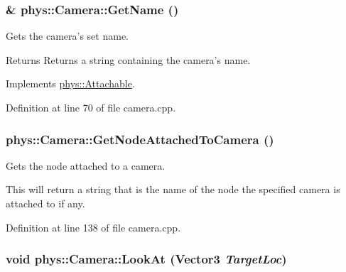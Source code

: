 \hypertarget{classphys_1_1Camera_aee08e3932237c76d2b59652878f2bdf6}{
\subsubsection[{GetName}]{ \& phys::Camera::GetName ()}}
\label{d9/df8/classphys_1_1Camera_aee08e3932237c76d2b59652878f2bdf6}


Gets the camera's set name. 

\begin{DoxyReturn}{Returns}
Returns a string containing the camera's name. 
\end{DoxyReturn}


Implements \hyperlink{classphys_1_1Attachable_ad1a9bbd300fe21c5cc7e5aa7e2c95b85}{phys::Attachable}.



Definition at line 70 of file camera.cpp.

\hypertarget{classphys_1_1Camera_ab32a8c708e5e22f65dde9ab821ea20fc}{
\subsubsection[{GetNodeAttachedToCamera}]{ phys::Camera::GetNodeAttachedToCamera ()}}
\label{d9/df8/classphys_1_1Camera_ab32a8c708e5e22f65dde9ab821ea20fc}


Gets the node attached to a camera. 

This will return a string that is the name of the node the specified camera is attached to if any. 

Definition at line 138 of file camera.cpp.

\hypertarget{classphys_1_1Camera_a6534be5001bf06ab4c4b32a084629842}{
\subsubsection[{LookAt}]{\setlength{\rightskip}{0pt plus 5cm}void phys::Camera::LookAt ({\bf Vector3} {\em TargetLoc})}}
\label{d9/df8/classphys_1_1Camera_a6534be5001bf06ab4c4b32a084629842}


